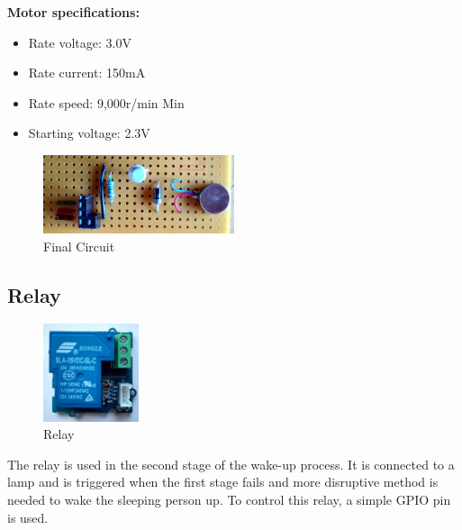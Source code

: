 \documentclass[12pt,a4paper]{article}
\begin{document}
		{\bfseries Motor specifications:}
		\begin{itemize}
			\item Rate voltage: 3.0V
			\item Rate current: 150mA
			\item Rate speed: 9,000r/min Min
			\item Starting voltage: 2.3V
		\end{itemize}
		
        \begin{figure}[h]
         \centering
         \includegraphics[width=0.5\textwidth]{circuit1.jpg}
         \caption{Final Circuit}
        \end{figure}
		
		\newpage
		\subsection{Relay}
        \begin{figure}
         \centering
         \includegraphics[width=0.25\textwidth]{relay1.jpg}
         \caption{Relay}
        \end{figure}
        
		The relay is used in the second stage of the wake-up process. It is connected to a lamp and is triggered when the first stage fails and more disruptive method is needed to wake the sleeping person up. To control this relay, a simple GPIO pin is used.\\\\\\\\\\\\
\end{document}
